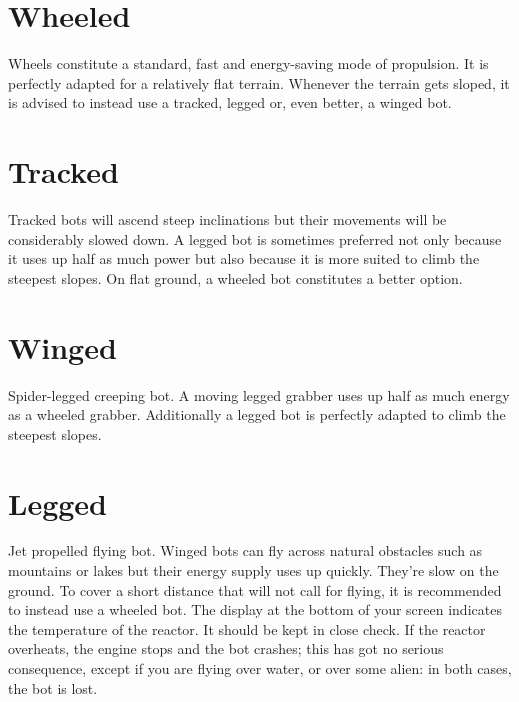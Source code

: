 \section{Wheeled}

Wheels constitute a standard, fast and energy-saving mode of propulsion. It is perfectly adapted for a relatively flat terrain. Whenever the terrain gets sloped, it is advised to instead use a tracked, legged or, even better, a winged bot.


\section{Tracked}

Tracked bots will ascend steep inclinations but their movements will be considerably slowed down. A legged bot is sometimes preferred not only because it uses up half as much power but also because it is more suited to climb the steepest slopes. On flat ground, a wheeled bot constitutes a better option.


\section{Winged}

Spider-legged creeping bot. A moving legged grabber uses up half as much energy as a wheeled grabber. Additionally a legged bot is perfectly adapted to climb the steepest slopes.


\section{Legged}

Jet propelled flying bot. Winged bots can fly across natural obstacles such as mountains or lakes but their energy supply uses up quickly. They're slow on the ground. To cover a short distance that will not call for flying, it is recommended to instead use a wheeled bot. The display at the bottom of your screen indicates the temperature of the reactor. It should be kept in close check. If the reactor overheats, the engine stops and the bot crashes; this has got no serious consequence, except if you are flying over water, or over some alien: in both cases, the bot is lost.